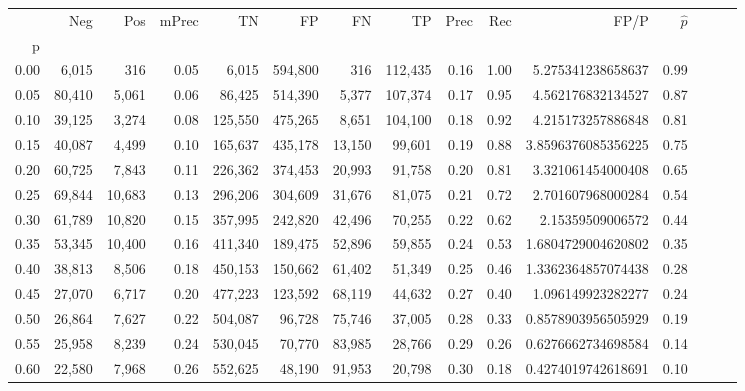 \begin{tabular}{rrrrrrrrrrrrrrr}
\toprule
{} &     Neg &     Pos & mPrec &       TN &       FP &       FN &       TP &  Prec &   Rec &                 FP/P & $\hat{p}$ \\
p    &         &         &       &          &          &          &          &       &       &                      &           \\
\midrule
0.00 &   6,015 &     316 &  0.05 &    6,015 &  594,800 &      316 &  112,435 &  0.16 &  1.00 &    5.275341238658637 &      0.99 \\
0.05 &  80,410 &   5,061 &  0.06 &   86,425 &  514,390 &    5,377 &  107,374 &  0.17 &  0.95 &    4.562176832134527 &      0.87 \\
0.10 &  39,125 &   3,274 &  0.08 &  125,550 &  475,265 &    8,651 &  104,100 &  0.18 &  0.92 &    4.215173257886848 &      0.81 \\
0.15 &  40,087 &   4,499 &  0.10 &  165,637 &  435,178 &   13,150 &   99,601 &  0.19 &  0.88 &   3.8596376085356225 &      0.75 \\
0.20 &  60,725 &   7,843 &  0.11 &  226,362 &  374,453 &   20,993 &   91,758 &  0.20 &  0.81 &    3.321061454000408 &      0.65 \\
0.25 &  69,844 &  10,683 &  0.13 &  296,206 &  304,609 &   31,676 &   81,075 &  0.21 &  0.72 &    2.701607968000284 &      0.54 \\
0.30 &  61,789 &  10,820 &  0.15 &  357,995 &  242,820 &   42,496 &   70,255 &  0.22 &  0.62 &     2.15359509006572 &      0.44 \\
0.35 &  53,345 &  10,400 &  0.16 &  411,340 &  189,475 &   52,896 &   59,855 &  0.24 &  0.53 &   1.6804729004620802 &      0.35 \\
0.40 &  38,813 &   8,506 &  0.18 &  450,153 &  150,662 &   61,402 &   51,349 &  0.25 &  0.46 &   1.3362364857074438 &      0.28 \\
0.45 &  27,070 &   6,717 &  0.20 &  477,223 &  123,592 &   68,119 &   44,632 &  0.27 &  0.40 &    1.096149923282277 &      0.24 \\
0.50 &  26,864 &   7,627 &  0.22 &  504,087 &   96,728 &   75,746 &   37,005 &  0.28 &  0.33 &   0.8578903956505929 &      0.19 \\
0.55 &  25,958 &   8,239 &  0.24 &  530,045 &   70,770 &   83,985 &   28,766 &  0.29 &  0.26 &   0.6276662734698584 &      0.14 \\
0.60 &  22,580 &   7,968 &  0.26 &  552,625 &   48,190 &   91,953 &   20,798 &  0.30 &  0.18 &   0.4274019742618691 &      0.10 \\

\end{tabular}
